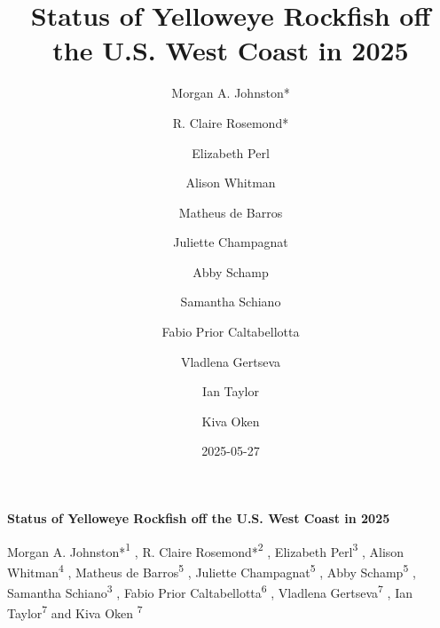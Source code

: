\documentclass[
]{scrartcl}
\title{Status of Yelloweye Rockfish off the U.S. West Coast in 2025}
\author{Morgan A. Johnston* \and R. Claire Rosemond* \and Elizabeth
Perl \and Alison Whitman \and Matheus de Barros \and Juliette
Champagnat \and Abby Schamp \and Samantha Schiano \and Fabio Prior
Caltabellotta \and Vladlena Gertseva \and Ian Taylor \and Kiva Oken}
\date{2025-05-27}
\begin{document}
  \begin{titlepage}

  \begin{minipage}[b][\textheight][s]{\textwidth}


  \raggedright




  {\huge\bfseries\nohyphens{Status of Yelloweye Rockfish off the U.S.
  West Coast in 2025}}\\[1\baselineskip]



  \vspace{1\baselineskip}


  \vspace{1\baselineskip}

   {\large{Morgan A. Johnston*}}{\textsuperscript{1}}%
  ,
   {\large{R. Claire Rosemond*}}{\textsuperscript{2}}%
  ,
   {\large{Elizabeth Perl}}{\textsuperscript{3}}%
  ,
   {\large{Alison Whitman}}{\textsuperscript{4}}%
  ,
   {\large{Matheus de Barros}}{\textsuperscript{5}}%
  ,
   {\large{Juliette Champagnat}}{\textsuperscript{5}}%
  ,
   {\large{Abby Schamp}}{\textsuperscript{5}}%
  ,
   {\large{Samantha Schiano}}{\textsuperscript{3}}%
  ,
   {\large{Fabio Prior Caltabellotta}}{\textsuperscript{6}}%
  ,
   {\large{Vladlena Gertseva}}{\textsuperscript{7}}%
  ,
   {\large{Ian Taylor}}{\textsuperscript{7}}%
  { and \large{Kiva Oken}}%
  {\textsuperscript{7}}%



\end{minipage}
\end{titlepage}
\end{document}
